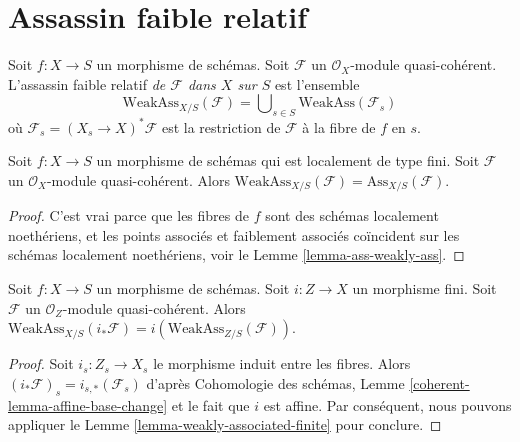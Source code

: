 \section{Assassin faible relatif}
\label{section-relative-weak-assassin}

\begin{definition}
\label{definition-relative-weak-assassin}
Soit  $f : X \to S$  un morphisme de schémas. Soit  $\mathcal{F}$  un
 $\mathcal{O}_X$-module quasi-cohérent. L'assassin faible relatif
 {\it  de  $\mathcal{F}$  dans  $X$  sur
 $S$}  est l'ensemble
$$
\text{WeakAss}_{X/S}(\mathcal{F}) =
\bigcup\nolimits_{s \in S} \text{WeakAss}(\mathcal{F}_s)
$$
où  $\mathcal{F}_s = (X_s \to X)^*\mathcal{F}$  est la restriction de  $\mathcal{F}$  à la fibre de  $f$  en
 $s$.
\end{definition}

\begin{lemma}
\label{lemma-relative-weak-assassin-assassin-finite-type}
Soit  $f : X \to S$  un morphisme de schémas qui est localement de type fini. Soit
 $\mathcal{F}$  un  $\mathcal{O}_X$-module quasi-cohérent. Alors  $\text{WeakAss}_{X/S}(\mathcal{F}) = \text{Ass}_{X/S}(\mathcal{F})$.
\end{lemma}

\begin{proof}
C'est vrai parce que les fibres de  $f$  sont des schémas localement
noethériens, et les points associés et faiblement associés coïncident sur les
schémas localement noethériens, voir le Lemme  \ref{lemma-ass-weakly-ass}.
\end{proof}

\begin{lemma}
\label{lemma-relative-weak-assassin-finite}
Soit  $f : X \to S$  un morphisme de schémas. Soit  $i : Z \to X$  un morphisme fini.
Soit  $\mathcal{F}$  un  $\mathcal{O}_Z$-module quasi-cohérent. Alors  $\text{WeakAss}_{X/S}(i_*\mathcal{F}) =
i(\text{WeakAss}_{Z/S}(\mathcal{F}))$.
\end{lemma}

\begin{proof}
Soit  $i_s : Z_s \to X_s$  le morphisme induit entre les fibres. Alors  $(i_*\mathcal{F})_s = i_{s, *}(\mathcal{F}_s)$  d'après
Cohomologie des schémas, Lemme  \ref{coherent-lemma-affine-base-change}  et le fait que  $i$  est
affine. Par conséquent, nous pouvons appliquer le Lemme  \ref{lemma-weakly-associated-finite}  pour
conclure.
\end{proof}





